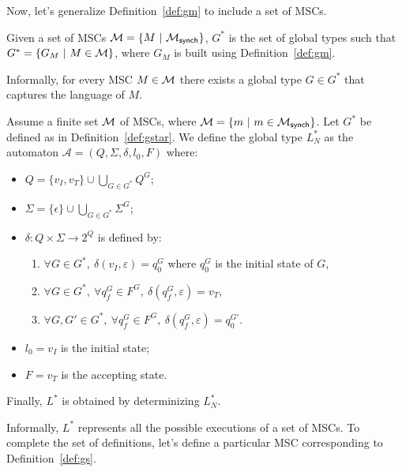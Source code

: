 Now, let's generalize Definition~\ref{def:gm} to include a set of MSCs.

\bigskip

\begin{definition}[$G^*$]\label{def:gstar}
	Given a set of MSCs $\mathcal{M} =\{M\ |\ \mscsetofmodel{\synchmodel}\}$,
	$G^*$ is the set of global types such that $G^*=\{G_M\ |\ M \in \mathcal{M}\}$,
	where $G_M$ is built using Definition~\ref{def:gm}.
\end{definition}

Informally, for every MSC $M\in\mathcal{M}$ there exists a global type $G\in G^*$ that
captures the language of $M$. 

\bigskip

\begin{definition}\label{def:lstar}
	Assume a finite set $\mathcal{M}$ of MSCs, where
	$\mathcal{M} = \{m\ |\ m \in \mathcal{M}_{\mathsf{synch}}\}$. Let $G^*$
	be defined as in Definition~\ref{def:gstar}.
	We define the global type $L^*_{N}$ as the automaton
	$\mathcal A = (Q,\Sigma, \delta, l_0, F)$ where:
	\begin{itemize}
		\item $Q = \{v_I,v_T\}\cup \bigcup_{G\in G^*} Q^G$;
		\item $\Sigma = \{\epsilon\}\cup\bigcup_{G\in G^*} \Sigma^G$;
		\item $\delta: Q \times \Sigma \rightarrow 2^Q$ is defined by:
			      \begin{enumerate}
				       \item $\forall G \in G^*,\ \delta(v_I, \varepsilon) = q_0^G$ where $q_0^G$ is the initial state of $G$,
				       \item $\forall G \in G^*,\ \forall q_f^G \in F^G,\ \delta(q_f^G, \varepsilon) = v_T$,
				       \item $\forall G, G' \in G^*,\ \forall q_f^G \in F^G,\ \delta(q_f^G, \varepsilon) = q_0^{G'}$.
			      \end{enumerate}
		\item $l_0 = v_I$ is the initial state;
		\item $F = v_T$ is the accepting state.
	\end{itemize}
	Finally, $L^*$ is obtained by determinizing $L^*_{N}$.
\end{definition}

Informally, $L^*$ represents all the
possible executions of a set of MSCs. To complete the set of definitions,
let's define a particular MSC corresponding to Definition~\ref{def:gs}.


